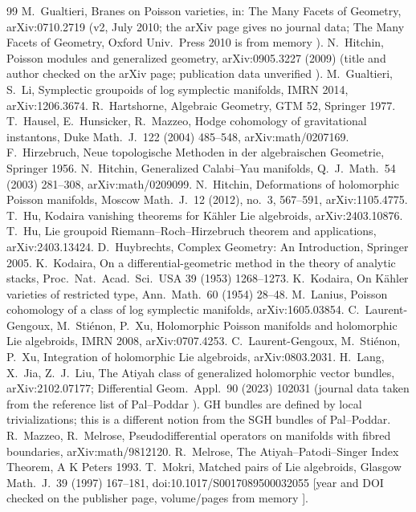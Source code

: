 \begin{thebibliography}{99}
 M.\ Gualtieri, Branes on Poisson varieties, in: The Many Facets of Geometry, arXiv:0710.2719 (v2, July 2010; the arXiv page gives no journal data; The Many Facets of Geometry, Oxford Univ.\ Press 2010 is from memory \tQ).
 N.\ Hitchin, Poisson modules and generalized geometry, arXiv:0905.3227 (2009) (title and author checked on the arXiv page; publication data unverified \tQ).
 M.\ Gualtieri, S.\ Li, Symplectic groupoids of log symplectic manifolds, IMRN 2014, arXiv:1206.3674.
 R.\ Hartshorne, Algebraic Geometry, GTM 52, Springer 1977.
 T.\ Hausel, E.\ Hunsicker, R.\ Mazzeo, Hodge cohomology of gravitational instantons, Duke Math.\ J.\ 122 (2004) 485--548, arXiv:math/0207169.
 F.\ Hirzebruch, Neue topologische Methoden in der algebraischen Geometrie, Springer 1956.
 N.\ Hitchin, Generalized Calabi--Yau manifolds, Q.\ J.\ Math.\ 54 (2003) 281--308, arXiv:math/0209099.
 N.\ Hitchin, Deformations of holomorphic Poisson manifolds, Moscow Math.\ J.\ 12 (2012), no.\ 3, 567--591, arXiv:1105.4775.
 T.\ Hu, Kodaira vanishing theorems for K\"ahler Lie algebroids, arXiv:2403.10876.
 T.\ Hu, Lie groupoid Riemann--Roch--Hirzebruch theorem and applications, arXiv:2403.13424.
 D.\ Huybrechts, Complex Geometry: An Introduction, Springer 2005.
 K.\ Kodaira, On a differential-geometric method in the theory of analytic stacks, Proc.\ Nat.\ Acad.\ Sci.\ USA 39 (1953) 1268--1273.
 K.\ Kodaira, On K\"ahler varieties of restricted type, Ann.\ Math.\ 60 (1954) 28--48.
 M.\ Lanius, Poisson cohomology of a class of log symplectic manifolds, arXiv:1605.03854.
 C.\ Laurent-Gengoux, M.\ Sti\'enon, P.\ Xu, Holomorphic Poisson manifolds and holomorphic Lie algebroids, IMRN 2008, arXiv:0707.4253.
 C.\ Laurent-Gengoux, M.\ Sti\'enon, P.\ Xu, Integration of holomorphic Lie algebroids, arXiv:0803.2031.
 H.\ Lang, X.\ Jia, Z.\ J.\ Liu, The Atiyah class of generalized holomorphic vector bundles, arXiv:2102.07177; Differential Geom.\ Appl.\ 90 (2023) 102031 (journal data taken from the reference list of Pal--Poddar \tQ). GH bundles are defined by local trivializations; this is a different notion from the SGH bundles of Pal--Poddar.
 R.\ Mazzeo, R.\ Melrose, Pseudodifferential operators on manifolds with fibred boundaries, arXiv:math/9812120.
 R.\ Melrose, The Atiyah--Patodi--Singer Index Theorem, A K Peters 1993.
 T.\ Mokri, Matched pairs of Lie algebroids, Glasgow Math.\ J.\ 39 (1997) 167--181, doi:10.1017/S0017089500032055 [year and DOI checked on the publisher page, volume/pages from memory \tQ].

\end{thebibliography}
